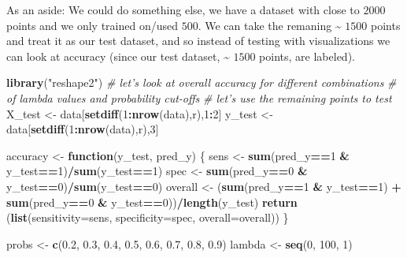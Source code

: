 \documentclass[]{article}
\newenvironment{Shaded}{\begin{snugshade}}{\end{snugshade}}
\newcommand{\CommentTok}[1]{\textcolor[rgb]{0.56,0.35,0.01}{\textit{#1}}}
\newcommand{\ControlFlowTok}[1]{\textcolor[rgb]{0.13,0.29,0.53}{\textbf{#1}}}
\newcommand{\DataTypeTok}[1]{\textcolor[rgb]{0.13,0.29,0.53}{#1}}
\newcommand{\DecValTok}[1]{\textcolor[rgb]{0.00,0.00,0.81}{#1}}
\newcommand{\FloatTok}[1]{\textcolor[rgb]{0.00,0.00,0.81}{#1}}
\newcommand{\KeywordTok}[1]{\textcolor[rgb]{0.13,0.29,0.53}{\textbf{#1}}}
\newcommand{\NormalTok}[1]{#1}
\newcommand{\OperatorTok}[1]{\textcolor[rgb]{0.81,0.36,0.00}{\textbf{#1}}}
\newcommand{\StringTok}[1]{\textcolor[rgb]{0.31,0.60,0.02}{#1}}
\begin{document}
As an aside: We could do something else, we have a dataset with close to
\(2000\) points and we only trained on/used \(500\). We can take the
remaning \textasciitilde{} \(1500\) points and treat it as our test
dataset, and so instead of testing with visualizations we can look at
accuracy (since our test dataset, \textasciitilde{} \(1500\) points, are
labeled).

\begin{Shaded}
\begin{Highlighting}[]
\KeywordTok{library}\NormalTok{(}\StringTok{"reshape2"}\NormalTok{)}
\CommentTok{# let's look at overall accuracy for different combinations}
\CommentTok{# of lambda values and probability cut-offs}
\CommentTok{# let's use the remaining points to test}
\NormalTok{X_test <-}\StringTok{ }\NormalTok{data[}\KeywordTok{setdiff}\NormalTok{(}\DecValTok{1}\OperatorTok{:}\KeywordTok{nrow}\NormalTok{(data),r),}\DecValTok{1}\OperatorTok{:}\DecValTok{2}\NormalTok{]}
\NormalTok{y_test <-}\StringTok{ }\NormalTok{data[}\KeywordTok{setdiff}\NormalTok{(}\DecValTok{1}\OperatorTok{:}\KeywordTok{nrow}\NormalTok{(data),r),}\DecValTok{3}\NormalTok{]}

\NormalTok{accuracy <-}\StringTok{ }\ControlFlowTok{function}\NormalTok{(y_test, pred_y) \{}
\NormalTok{  sens <-}\StringTok{ }\KeywordTok{sum}\NormalTok{(pred_y}\OperatorTok{==}\DecValTok{1} \OperatorTok{&}\StringTok{ }\NormalTok{y_test}\OperatorTok{==}\DecValTok{1}\NormalTok{)}\OperatorTok{/}\KeywordTok{sum}\NormalTok{(y_test}\OperatorTok{==}\DecValTok{1}\NormalTok{)}
\NormalTok{  spec <-}\StringTok{ }\KeywordTok{sum}\NormalTok{(pred_y}\OperatorTok{==}\DecValTok{0} \OperatorTok{&}\StringTok{ }\NormalTok{y_test}\OperatorTok{==}\DecValTok{0}\NormalTok{)}\OperatorTok{/}\KeywordTok{sum}\NormalTok{(y_test}\OperatorTok{==}\DecValTok{0}\NormalTok{)}
\NormalTok{  overall <-}\StringTok{ }\NormalTok{(}\KeywordTok{sum}\NormalTok{(pred_y}\OperatorTok{==}\DecValTok{1} \OperatorTok{&}\StringTok{ }\NormalTok{y_test}\OperatorTok{==}\DecValTok{1}\NormalTok{) }\OperatorTok{+}\StringTok{ }\KeywordTok{sum}\NormalTok{(pred_y}\OperatorTok{==}\DecValTok{0} \OperatorTok{&}\StringTok{ }\NormalTok{y_test}\OperatorTok{==}\DecValTok{0}\NormalTok{))}\OperatorTok{/}\KeywordTok{length}\NormalTok{(y_test)}
  \KeywordTok{return}\NormalTok{ (}\KeywordTok{list}\NormalTok{(}\DataTypeTok{sensitivity=}\NormalTok{sens, }\DataTypeTok{specificity=}\NormalTok{spec, }\DataTypeTok{overall=}\NormalTok{overall))}
\NormalTok{\}}

\NormalTok{probs <-}\StringTok{ }\KeywordTok{c}\NormalTok{(}\FloatTok{0.2}\NormalTok{, }\FloatTok{0.3}\NormalTok{, }\FloatTok{0.4}\NormalTok{, }\FloatTok{0.5}\NormalTok{, }\FloatTok{0.6}\NormalTok{, }\FloatTok{0.7}\NormalTok{, }\FloatTok{0.8}\NormalTok{, }\FloatTok{0.9}\NormalTok{)}
\NormalTok{lambda <-}\StringTok{ }\KeywordTok{seq}\NormalTok{(}\DecValTok{0}\NormalTok{, }\DecValTok{100}\NormalTok{, }\DecValTok{1}\NormalTok{)}


\end{Highlighting}
\end{Shaded}
\end{document}
